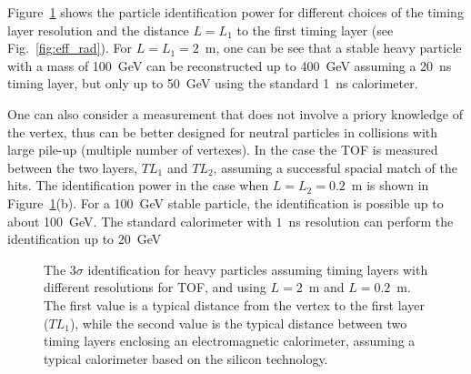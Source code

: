 Figure~\ref{fig:signgleBSM} shows the particle identification power for different choices of the timing layer resolution
and the distance $L=L_1$ to the first timing layer (see Fig.~\ref{fig:eff_rad}).
For $L=L_1=2$~m, one can be see that a stable heavy particle with a mass of 100~GeV can be reconstructed up to 
400~GeV assuming a 20~ns timing layer,
but only up to 50~GeV using the standard 1~ns calorimeter.

One can also consider a  measurement that does not involve a priory knowledge  of the vertex, thus can be better
designed for neutral particles in collisions with large pile-up (multiple number of vertexes).  
In the case the TOF is measured between the two layers, $TL_1$ and $TL_2$, assuming a successful spacial match of the hits.
The identification power in the case when $L=L_2 = 0.2$~m is shown in Figure~\ref{fig:signgleBSM}(b).
For a 100~GeV stable particle, the identification is possible up to about 100~GeV. The standard calorimeter with
$1$~ns resolution can perform the identification up to $20$~GeV 
    


\begin{figure}
\begin{center}
\end{center}
\caption{
The $3\sigma$ identification for heavy particles assuming timing layers with different resolutions for TOF, and using $L=2$~m and $L=0.2$~m.
The first value is a typical distance
from the vertex to the first layer ($TL_1$), while the second value is the typical  distance 
between two timing layers enclosing an electromagnetic calorimeter, assuming a typical calorimeter 
based on the silicon technology. 
}
\label{fig:signgleBSM}
\end{figure}


   
 
 


   
 





